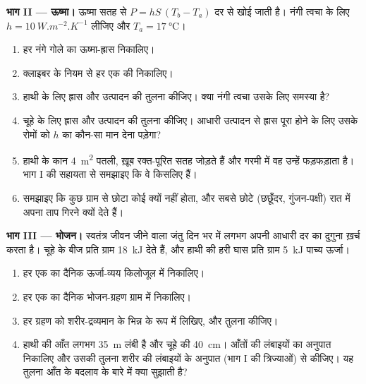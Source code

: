 \begin{problem}
\medskip
\noindent\textbf{भाग II --- ऊष्मा।}
ऊष्मा सतह से $P = hS\,(T_b - T_a)$ दर से खोई जाती है। नंगी त्वचा के लिए
$h = \qty{10}{W.m^{-2}.K^{-1}}$ लीजिए और $T_a =
\qty{17}{\celsius}$।
\begin{enumerate}[resume]
  \item हर नंगे गोले का ऊष्मा-ह्रास निकालिए।
  \item क्लाइबर के नियम से हर एक की  निकालिए।
  \item हाथी के लिए ह्रास और उत्पादन की तुलना कीजिए। क्या नंगी त्वचा
        उसके लिए समस्या है?
  \item चूहे के लिए ह्रास और उत्पादन की तुलना कीजिए। आधारी उत्पादन से
        ह्रास पूरा होने के लिए उसके रोमों को $h$ का कौन-सा मान देना
        पड़ेगा?
  \item हाथी के कान \qty{4}{m^2} पतली, ख़ूब रक्त-पूरित सतह जोड़ते हैं
        और गरमी में वह उन्हें फड़फड़ाता है। भाग I की सहायता से समझाइए
        कि वे किसलिए हैं।
  \item समझाइए कि कुछ ग्राम से छोटा कोई  क्यों नहीं होता, और
        सबसे छोटे  (छछूँदर, गुंजन-पक्षी) रात में अपना ताप गिरने
        क्यों देते हैं।
\end{enumerate}

\medskip
\noindent\textbf{भाग III --- भोजन।}
स्वतंत्र जीवन जीने वाला जंतु दिन भर में लगभग अपनी आधारी दर का दुगुना
ख़र्च करता है। चूहे के बीज प्रति ग्राम \qty{18}{kJ} देते हैं, और हाथी की
हरी घास प्रति ग्राम \qty{5}{kJ} पाच्य ऊर्जा।
\begin{enumerate}[resume]
  \item हर एक का दैनिक ऊर्जा-व्यय किलोजूल में निकालिए।
  \item हर एक का दैनिक भोजन-ग्रहण ग्राम में निकालिए।
  \item हर ग्रहण को शरीर-द्रव्यमान के भिन्न के रूप में लिखिए, और तुलना
        कीजिए।
  \item हाथी की आँत लगभग \qty{35}{m} लंबी है और चूहे की \qty{40}{cm}।
        आँतों की लंबाइयों का अनुपात निकालिए और उसकी तुलना शरीर की
        लंबाइयों के अनुपात (भाग I की त्रिज्याओं) से कीजिए। यह तुलना
        आँत के  बदलाव के बारे में क्या सुझाती है?
\end{enumerate}


\end{problem}
